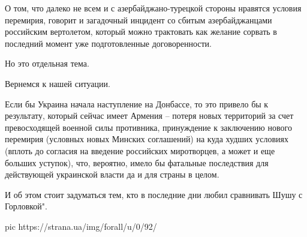 О том, что далеко не всем и с азербайджано-турецкой стороны нравятся условия
перемирия, говорит и загадочный инцидент со сбитым азербайджанцами российским
вертолетом, который можно трактовать как желание сорвать в последний момент уже
подготовленные договоренности.

Но это отдельная тема.

Вернемся к нашей ситуации.

Если бы Украина начала наступление на Донбассе, то это привело бы к
результату, который сейчас имеет Армения – потеря новых территорий за счет
превосходящей военной силы противника, принуждение к заключению нового
перемирия (условных новых Минских соглашений) на куда худших условиях
(вплоть до согласия на введение российских миротворцев, а может и еще
больших уступок), что, вероятно, имело бы фатальные последствия для
действующей украинской власти да и для страны в целом.

И об этом стоит задуматься тем, кто в последние дни любил сравнивать Шушу с
Горловкой".

\ifcmt
pic https://strana.ua/img/forall/u/0/92/%
\fi
